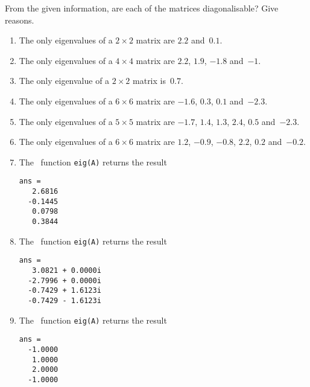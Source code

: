 \begin{exercise} \label{ex:} 
From the given information, are each of the matrices diagonalisable?  
Give reasons.
\begin{enumerate}
\item The only eigenvalues of a \(2\times2\) matrix are \(2.2\) and~\(0.1\).

\item The only eigenvalues of a \(4\times4\) matrix are \(2.2\), \(1.9\), \(-1.8\) and~\(-1\).

\item The only eigenvalue of a \(2\times2\) matrix is~\(0.7\).

\item The only eigenvalues of a \(6\times6\) matrix are \(-1.6\), \(0.3\), \(0.1\) and~\(-2.3\).

\item The only eigenvalues of a \(5\times5\) matrix are \(-1.7\), \(1.4\), \(1.3\), \(2.4\), \(0.5\) and~\(-2.3\).

\item The only eigenvalues of a \(6\times6\) matrix are \(1.2\), \(-0.9\), \(-0.8\), \(2.2\), \(0.2\) and~\(-0.2\).

\item The \script\ function \verb|eig(A)| returns the result
\begin{verbatim}
ans =
   2.6816
  -0.1445
   0.0798
   0.3844
\end{verbatim}

\item The \script\ function \verb|eig(A)| returns the result
\begin{verbatim}
ans =
   3.0821 + 0.0000i
  -2.7996 + 0.0000i
  -0.7429 + 1.6123i
  -0.7429 - 1.6123i
\end{verbatim}

\item The \script\ function \verb|eig(A)| returns the result
\begin{verbatim}
ans =
  -1.0000
   1.0000
   2.0000
  -1.0000
\end{verbatim}

\end{enumerate}
\end{exercise}




